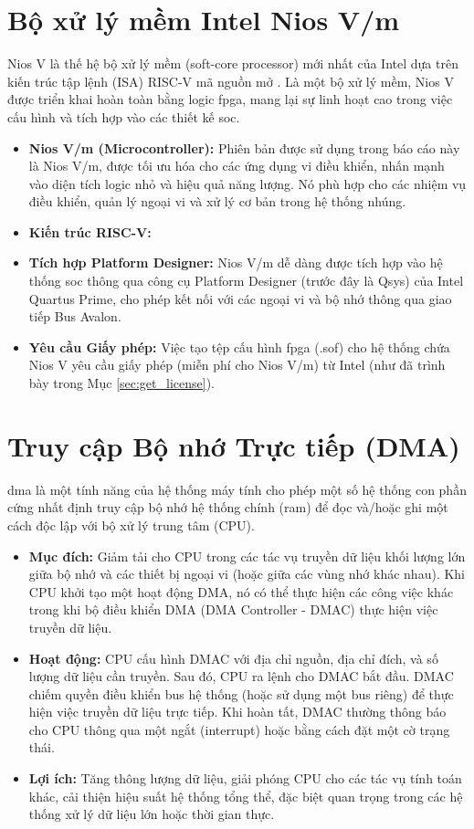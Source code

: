 \section{Bộ xử lý mềm Intel Nios V/m}
Nios V là thế hệ bộ xử lý mềm (soft-core processor) mới nhất của Intel dựa trên kiến trúc tập lệnh (ISA) RISC-V mã nguồn mở \cite{intelNiosVHandbook}. Là một bộ xử lý mềm, Nios V được triển khai hoàn toàn bằng logic \acrshort{fpga}, mang lại sự linh hoạt cao trong việc cấu hình và tích hợp vào các thiết kế \acrshort{soc}.
\begin{itemize}
    \item \textbf{Nios V/m (Microcontroller):} Phiên bản được sử dụng trong báo cáo này là Nios V/m, được tối ưu hóa cho các ứng dụng vi điều khiển, nhấn mạnh vào diện tích logic nhỏ và hiệu quả năng lượng. Nó phù hợp cho các nhiệm vụ điều khiển, quản lý ngoại vi và xử lý cơ bản trong hệ thống nhúng.
    \item \textbf{Kiến trúc RISC-V:} 
    \item \textbf{Tích hợp Platform Designer:} Nios V/m dễ dàng được tích hợp vào hệ thống \acrshort{soc} thông qua công cụ Platform Designer (trước đây là Qsys) của Intel Quartus Prime, cho phép kết nối với các ngoại vi và bộ nhớ thông qua giao tiếp Bus Avalon.
    \item \textbf{Yêu cầu Giấy phép:} Việc tạo tệp cấu hình \acrshort{fpga} (.sof) cho hệ thống chứa Nios V yêu cầu giấy phép (miễn phí cho Nios V/m) từ Intel (như đã trình bày trong Mục \ref{sec:get_license}).
\end{itemize}

\section{Truy cập Bộ nhớ Trực tiếp (DMA)}
\acrfull{dma} là một tính năng của hệ thống máy tính cho phép một số hệ thống con phần cứng nhất định truy cập bộ nhớ hệ thống chính (\acrshort{ram}) để đọc và/hoặc ghi một cách độc lập với bộ xử lý trung tâm (CPU).
\begin{itemize}
    \item \textbf{Mục đích:} Giảm tải cho CPU trong các tác vụ truyền dữ liệu khối lượng lớn giữa bộ nhớ và các thiết bị ngoại vi (hoặc giữa các vùng nhớ khác nhau). Khi CPU khởi tạo một hoạt động DMA, nó có thể thực hiện các công việc khác trong khi bộ điều khiển DMA (DMA Controller - DMAC) thực hiện việc truyền dữ liệu.
    \item \textbf{Hoạt động:} CPU cấu hình DMAC với địa chỉ nguồn, địa chỉ đích, và số lượng dữ liệu cần truyền. Sau đó, CPU ra lệnh cho DMAC bắt đầu. DMAC chiếm quyền điều khiển bus hệ thống (hoặc sử dụng một bus riêng) để thực hiện việc truyền dữ liệu trực tiếp. Khi hoàn tất, DMAC thường thông báo cho CPU thông qua một ngắt (interrupt) hoặc bằng cách đặt một cờ trạng thái.
    \item \textbf{Lợi ích:} Tăng thông lượng dữ liệu, giải phóng CPU cho các tác vụ tính toán khác, cải thiện hiệu suất hệ thống tổng thể, đặc biệt quan trọng trong các hệ thống xử lý dữ liệu lớn hoặc thời gian thực.
\end{itemize}


